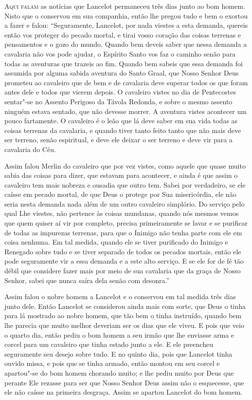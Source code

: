 \textsc{Aqui falam} as notícias que Lancelot permaneceu três dias junto ao bom homem. 
Nisto que o conservou em sua companhia, então lhe pregou tudo e bem o
exortou a fazer e falou: “Seguramente, Lancelot, por nada viestes a esta
demanda, quereis então vos proteger do pecado mortal, e tirai vosso coração das
coisas terrenas e pensamentos e o gozo do mundo. Quando bem deveis
saber que nessa demanda a cavalaria não vos pode ajudar, o Espírito Santo vos
faz o caminho senão para todas as aventuras que trazeis ao fim. Quando bem
sabeis que essa demanda foi assumida por alguma sabida aventura do Santo Graal,
que Nosso Senhor Deus prometeu ao cavaleiro que de bem e de cavalaria deve
superar todos os que foram antes dele e todos que vierem depois. O cavaleiro
vistes no dia de Pentecostes sentar"-se no Assento Perigoso da Távola Redonda, e
sobre o mesmo assento ninguém estava sentado, que não devesse morrer. A
aventura vistes acontecer um pouco fartamente. O cavaleiro é o leão que lá deve
saber em sua vida todas as coisas terrenas da cavalaria, e quando tiver tanto
feito tanto que não mais deve ser terreno, senão espiritual, e deve ele deixar
o ser terreno e deve vir para a cavalaria do Céu. 

Assim falou Merlin do cavaleiro que por vez vistes, como aquele que quase
muito sabia das coisas para dizer, que estavam para acontecer, e ainda é que
assim o cavaleiro tem mais nobreza e ousadia que outro tem. Sabei por
verdadeiro, se ele caísse em pecado mortal, de que Deus o protege por Sua
misericórdia, ele não seria nesta demanda nada além de um outro cavaleiro
simplório. Do serviço pelo qual Lhe viestes, não pertence às coisas mundanas,
quando nós mesmos vemos que quem quiser aí vir por completo, precisa
primeiramente se lavar e se purificar de todas as impurezas terrenas, para que
o Inimigo não tenha parte com ele em coisa nenhuma. Em tal medida, quando ele
se tiver purificado do Inimigo e Renegado sobre tudo e se tiver separado de
todos os pecados mortais, então ele pode seguramente vir a essa demanda e a
este alto serviço. E se ele for de fé tão débil que considere fazer mais por
meio de sua cavalaria que da graça de Nosso Senhor, sabei que nunca saíra dela
senão com desonra.” 

Assim falou o nobre homem a Lancelot e o conservou em tal medida três dias
junto dele. Então Lancelot se considerou ainda mais com sorte, que Deus o tinha
para lá mostrado ao nobre homem, que tão bem o tinha instruído, quando bem lhe
parecia que muito melhor deveriam ser os dias que ele viveu. E pois que veio o
quarto dia, então pediu o bom homem a seu irmão que lhe enviasse arma e corcel
para um cavaleiro que tinha estado junto a ele. E ele preencheu seguramente seu
desejo sobre tudo. E no quinto dia, pois que Lancelot tinha ouvido missa, e
pois que se tinha armado, então montou em seu corcel e apartou"-se do bom homem
chorando muito; e lhe pediu muito por Deus que perante Ele rezasse para ser que
Nosso Senhor Deus assim não o esquecesse, que ele não caísse na primeira
desgraça. Assim se apartou Lancelot do bom homem. 

